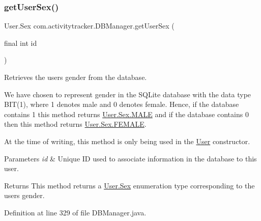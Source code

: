 \subsubsection{\texorpdfstring{get\+User\+Sex()}{getUserSex()}}
{\footnotesize\ttfamily User.\+Sex com.\+activitytracker.\+D\+B\+Manager.\+get\+User\+Sex (\begin{DoxyParamCaption}\item[{final int}]{id }\end{DoxyParamCaption})}

Retrieves the user\textquotesingle{}s gender from the database.

We have chosen to represent gender in the S\+Q\+Lite database with the data type B\+IT(1), where 1 denotes male and 0 denotes female. Hence, if the database contains 1 this method returns \mbox{\hyperlink{enumcom_1_1activitytracker_1_1_user_1_1_sex_ad3b626a38bd4615eb621d75b939f412d}{User.\+Sex.\+M\+A\+LE}} and if the database contains 0 then this method returns \mbox{\hyperlink{enumcom_1_1activitytracker_1_1_user_1_1_sex_a5c22ece8a4df71ed5202cd492990a752}{User.\+Sex.\+F\+E\+M\+A\+LE}}.

At the time of writing, this method is only being used in the \mbox{\hyperlink{classcom_1_1activitytracker_1_1_user}{User}} constructor.


\begin{DoxyParams}{Parameters}
{\em id} & Unique ID used to associate information in the database to this user.\\
\hline
\end{DoxyParams}
\begin{DoxyReturn}{Returns}
This method returns a \mbox{\hyperlink{enumcom_1_1activitytracker_1_1_user_1_1_sex}{User.\+Sex}} enumeration type corresponding to the user\textquotesingle{}s gender. 
\end{DoxyReturn}


Definition at line 329 of file D\+B\+Manager.\+java.


